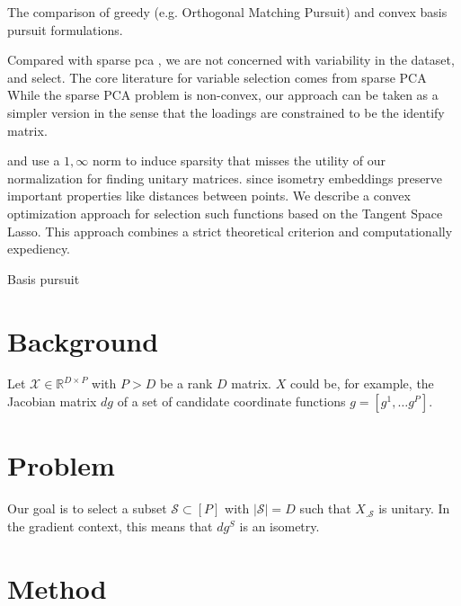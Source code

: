 \documentclass[a4paper,11pt]{article}
\begin{document}
The comparison of greedy (e.g. Orthogonal Matching Pursuit) \cite{Mallat93-wi, Tropp05-ml} and convex \cite{Tropp06-sg} basis pursuit formulations.


Compared with sparse pca \cite{Bertsimas2022-qo, Bertsimas2022-dv}, we are not concerned with variability in the dataset, and select.
The core literature for variable selection comes from sparse PCA \cite{Dey2017-mx}
While the sparse PCA problem is non-convex, our approach can be taken as a simpler version in the sense that the loadings are constrained to be the identify matrix.


\cite{Tropp06-sg} and \cite{Liu2009-yo} use a $1,\infty$ norm to induce sparsity that misses the utility of our normalization for finding unitary matrices.
since isometry embeddings preserve important properties like distances between points.
We describe a convex optimization approach for selection such functions based on the Tangent Space Lasso.
This approach combines a strict theoretical criterion and computationally expediency.

Basis pursuit \cite{Chen2001-hh} 



\section{Background}

Let $\mathcal X \in \mathbb R^{D \times P}$ with $P > D$ be a rank $D$ matrix.
$X$ could be, for example, the Jacobian matrix $d g$ of a set of candidate coordinate functions $g = [g^1, \dotsc g^P]$.

\section{Problem}

Our goal is to select a subset $\mathcal S \subset [P]$ with $|\mathcal S| = D$ such that $X_{. \mathcal S}$ is unitary.
In the gradient context, this means that $d g^S$ is an isometry.

\section{Method}

\end{document}

